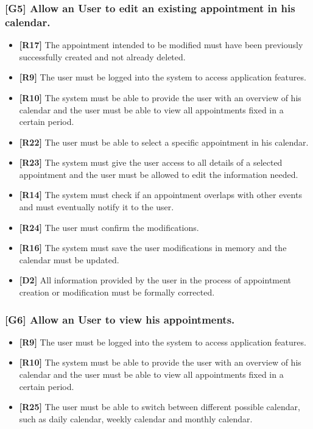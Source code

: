 \subsubsection{[G5] Allow an User to edit an existing appointment in his calendar.}
\begin{itemize}
	\item \textbf{[R17]} The appointment intended to be modified must have been previously successfully created and not already deleted.
	\item \textbf{[R9]} The user must be logged into the system to access application features.
	\item \textbf{[R10]} The system must be able to provide the user with an overview of his calendar and the user must be able to view all appointments fixed in a certain period.
	\item \textbf{[R22]} The user must be able to select a specific appointment in his calendar.
	\item \textbf{[R23]} The system must give the user access to all details of a selected appointment and the user must be allowed to edit the information needed.
	\item \textbf{[R14]} The system must check if an appointment overlaps with other events and must eventually notify it to the user.
	\item \textbf{[R24]} The user must confirm the modifications.
	\item \textbf{[R16]} The system must save the user modifications in memory and the calendar must be updated.
	\item \textbf{[D2]} All information provided by the user in the process of appointment creation or modification must be formally corrected.
	
\end{itemize}
\subsubsection{[G6] Allow an User to view his appointments.}
\begin{itemize}
	\item \textbf{[R9]} The user must be logged into the system to access application features.
	\item \textbf{[R10]} The system must be able to provide the user with an overview of his calendar and the user must be able to view all appointments fixed in a certain period.
	\item \textbf{[R25]} The user must be able to switch between different possible calendar, such as daily calendar, weekly calendar and monthly calendar.
	
\end{itemize}
